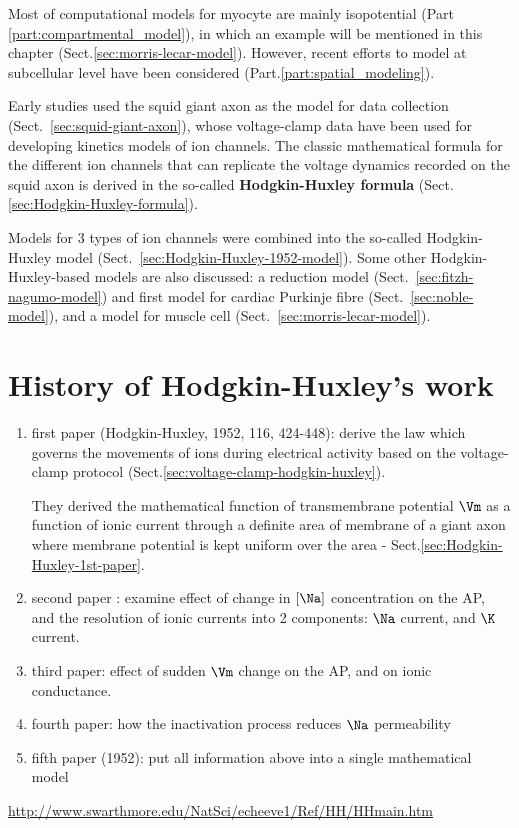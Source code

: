Most of computational models for myocyte are mainly isopotential (Part
\ref{part:compartmental_model}), in which an example will be mentioned in this
chapter (Sect.\ref{sec:morris-lecar-model}). However, recent efforts to model at
subcellular level have been considered (Part.\ref{part:spatial_modeling}).


\begin{mdframed}

Early studies used the squid giant axon as the model for data collection
(Sect.~\ref{sec:squid-giant-axon}), whose voltage-clamp data have been used for
developing kinetics models of ion channels. The classic mathematical formula for
the different ion channels that can replicate the voltage dynamics recorded on
the squid axon is derived in the so-called {\bf Hodgkin-Huxley formula}
(Sect.\ref{sec:Hodgkin-Huxley-formula}).

Models for 3 types of ion channels were combined into the so-called
Hodgkin-Huxley model (Sect.~\ref{sec:Hodgkin-Huxley-1952-model}). Some other
Hodgkin-Huxley-based models are also discussed: a reduction model
(Sect.~\ref{sec:fitzh-nagumo-model}) and first model for cardiac Purkinje fibre
(Sect.~\ref{sec:noble-model}), and a model for muscle cell
(Sect.~\ref{sec:morris-lecar-model}).

\end{mdframed}

\section{History of Hodgkin-Huxley's work}
\label{sec:Hodgkin-Huxley-series-works}

\begin{enumerate}
  \item first paper (Hodgkin-Huxley, 1952, 116, 424-448): derive the law which
  governs the movements of ions during electrical activity based on
  the voltage-clamp protocol (Sect.\ref{sec:voltage-clamp-hodgkin-huxley}).
  
  They derived the mathematical function of transmembrane potential $\Vm$ as a
  function of ionic current through a definite area of membrane of a giant axon
  where membrane potential is kept uniform over the area -
  Sect.\ref{sec:Hodgkin-Huxley-1st-paper}.
  
  \item second paper : examine effect of change in $[\Na]$ concentration on the
  AP, and the resolution of ionic currents into 2 components: $\Na $ current,
  and $\K$ current.
  
  \item third paper: effect of sudden $\Vm$ change on the AP, and on ionic
  conductance.
  
  \item fourth paper: how the inactivation process reduces $\Na$ permeability
  
  \item fifth paper (1952): put all information above into a single mathematical
  model
\end{enumerate}
\url{http://www.swarthmore.edu/NatSci/echeeve1/Ref/HH/HHmain.htm}

